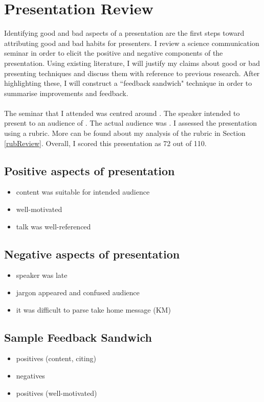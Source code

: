\section{Presentation Review} \label{semRev}

Identifying good and bad aspects of a presentation are the first steps toward attributing good and
bad habits for presenters.
I review a science communication seminar in order to elicit the positive and negative components of
the presentation.
Using existing literature, I will justify my claims about good or bad presenting techniques and
discuss them with reference to previous research.
After highlighting these, I will construct a ``feedback sandwich" technique \FIXME in order to summarise
improvements and feedback.\\
\\
The seminar that I attended was centred around \FIXME.
The speaker intended to present to an audience of \FIXME.
The actual audience was \FIXME.
I assessed the presentation using a rubric.
More can be found about my analysis of the rubric in Section \ref{rubReview}.
Overall, I scored this presentation as 72 out of 110.

\subsection{Positive aspects of presentation} \label{semRevPlus}

\begin{itemize}
	\item content was suitable for intended audience
	\item well-motivated
	\item talk was well-referenced
\end{itemize}

\subsection{Negative aspects of presentation} \label{semRevMinus}

\begin{itemize}
	\item speaker was late
	\item jargon appeared and confused audience
	\item it was difficult to parse take home message (KM)
\end{itemize}

\subsection{Sample Feedback Sandwich} \label{semRevSandwich}

\begin{itemize}
	\item positives (content, citing)
	\item negatives
	\item positives (well-motivated)
\end{itemize}

